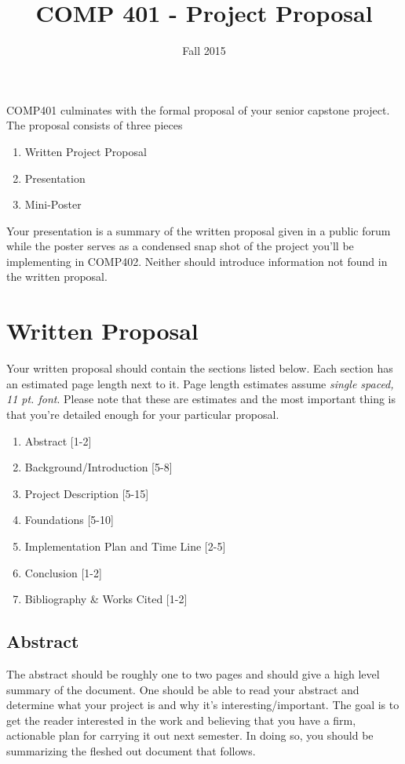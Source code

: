\documentclass[10pt]{article}
\title{COMP 401 - Project Proposal}
\author{  }
\date{Fall 2015}
\begin{document}
\maketitle

COMP401 culminates with the formal proposal of your senior capstone project.  The proposal consists of three pieces
\begin{enumerate}
\item Written Project Proposal
\item Presentation
\item Mini-Poster
\end{enumerate}
Your presentation is a summary of the written proposal given in a public forum while the poster serves as a condensed snap shot of the project you'll be implementing in COMP402.  Neither should introduce information not found in the written proposal.

\section{Written Proposal}

Your written proposal should contain the sections listed below.  Each section has an estimated page length next to it.  Page length estimates assume \textit{single spaced, 11 pt. font}.  Please note that these are estimates and the most important thing is that you're detailed enough for your particular proposal.    
\begin{enumerate}
\item Abstract [1-2]
\item Background/Introduction [5-8]
\item Project Description [5-15]
\item Foundations [5-10] 
\item Implementation Plan and Time Line [2-5]
\item Conclusion [1-2]
\item Bibliography \& Works Cited [1-2]
\end{enumerate}

\subsection{Abstract}

The abstract should be roughly one to two pages and should give a high level summary of the document.  One should be able to read your abstract and determine what your project is and why it's interesting/important.  The goal is to get the reader interested in the work and believing that you have a firm, actionable plan for carrying it out next semester. In doing so, you should be summarizing the fleshed out document that follows. 
\end{document}
